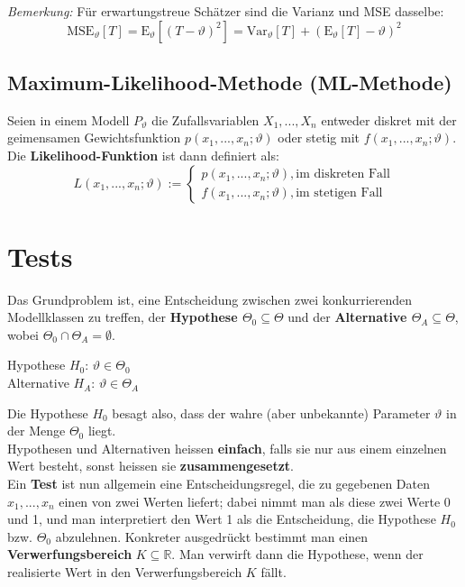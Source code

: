 \documentclass[11pt]{article}
\newcommand{\E}{\text{E}}
\newcommand{\Var}{\text{Var}}
\newcommand{\MSE}{\text{MSE}}
\begin{document}
\emph{Bemerkung:} F{\"u}r erwartungstreue Sch{\"a}tzer sind die Varianz und MSE dasselbe:
\begin{equation*}
	\MSE_\vartheta[T] = \E_\vartheta[(T-\vartheta)^2] = \Var_\vartheta[T] + (\E_\vartheta[T] - \vartheta)^2
\end{equation*}

\subsection{Maximum-Likelihood-Methode (ML-Methode)}

Seien in einem Modell $P_\vartheta$ die Zufallsvariablen $X_1,...,X_n$ entweder diskret mit der geimensamen Gewichtsfunktion $p(x_1,...,x_n;\vartheta)$ oder stetig mit $f(x_1,...,x_n;\vartheta)$. Die \textbf{Likelihood-Funktion} ist dann definiert als:
\begin{equation*}
	L(x_1,...,x_n;\vartheta) := \begin{cases}
		p(x_1,...,x_n; \vartheta), \text{im diskreten Fall} \\
		f(x_1,...,x_n; \vartheta), \text{im stetigen Fall}
	\end{cases}
\end{equation*}

\section{Tests}

Das Grundproblem ist, eine Entscheidung zwischen zwei konkurrierenden Modellklassen zu treffen, der \textbf{Hypothese $\Theta_0 \subseteq \Theta$} und der \textbf{Alternative $\Theta_A \subseteq \Theta$}, wobei $\Theta_0 \cap \Theta_A = \emptyset$.

\begin{center}
	Hypothese $H_0$: $\vartheta \in \Theta_0$ \\
	Alternative $H_A$: $\vartheta \in \Theta_A$
\end{center}

Die Hypothese $H_0$ besagt also, dass der wahre (aber unbekannte) Parameter $\vartheta$ in der Menge $\Theta_0$ liegt. \\
Hypothesen und Alternativen heissen \textbf{einfach}, falls sie nur aus einem einzelnen Wert besteht, sonst heissen sie \textbf{zusammengesetzt}. \\

Ein \textbf{Test} ist nun allgemein eine Entscheidungsregel, die zu gegebenen Daten $x_1,...,x_n$ einen von zwei Werten liefert; dabei nimmt man als diese zwei Werte 0 und 1, und man interpretiert den Wert 1 als die Entscheidung, die Hypothese $H_0$ bzw. $\Theta_0$ abzulehnen. Konkreter ausgedrückt bestimmt man einen \textbf{Verwerfungsbereich} $K \subseteq \mathbb{R}$. Man verwirft dann die Hypothese, wenn der realisierte Wert in den Verwerfungsbereich $K$ fällt. \\
\end{document}

